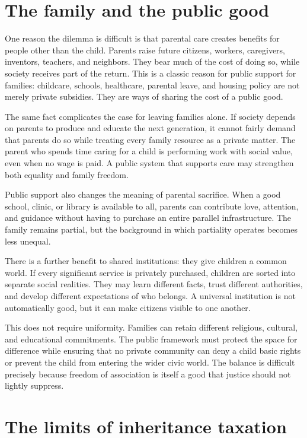 ﻿\documentclass[12pt,a4paper]{book}
\begin{document}
\section{The family and the public good}

One reason the dilemma is difficult is that parental care creates benefits
for people other than the child.  Parents raise future citizens, workers,
caregivers, inventors, teachers, and neighbors.  They bear much of the cost
of doing so, while society receives part of the return.  This is a classic
reason for public support for families: childcare, schools, healthcare,
parental leave, and housing policy are not merely private subsidies.  They
are ways of sharing the cost of a public good.

The same fact complicates the case for leaving families alone.  If society
depends on parents to produce and educate the next generation, it cannot
fairly demand that parents do so while treating every family resource as a
private matter.  The parent who spends time caring for a child is performing
work with social value, even when no wage is paid.  A public system that
supports care may strengthen both equality and family freedom.

Public support also changes the meaning of parental sacrifice.  When a good
school, clinic, or library is available to all, parents can contribute love,
attention, and guidance without having to purchase an entire parallel
infrastructure.  The family remains partial, but the background in which
partiality operates becomes less unequal.

There is a further benefit to shared institutions: they give children a
common world.  If every significant service is privately purchased, children
are sorted into separate social realities.  They may learn different facts,
trust different authorities, and develop different expectations of who
belongs.  A universal institution is not automatically good, but it can make
citizens visible to one another.

This does not require uniformity.  Families can retain different religious,
cultural, and educational commitments.  The public framework must protect
the space for difference while ensuring that no private community can deny a
child basic rights or prevent the child from entering the wider civic world.
The balance is difficult precisely because freedom of association is itself
a good that justice should not lightly suppress.

\section{The limits of inheritance taxation}
\end{document}
